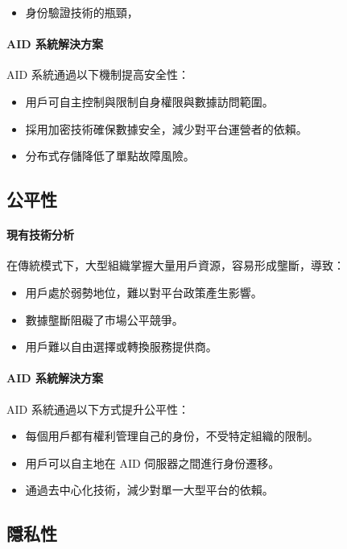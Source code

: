 \begin{itemize}
  \item 身份驗證技術的瓶頸，
\end{itemize}

\paragraph{AID 系統解決方案}
AID 系統通過以下機制提高安全性：
\begin{itemize}
  \item 用戶可自主控制與限制自身權限與數據訪問範圍。
  \item 採用加密技術確保數據安全，減少對平台運營者的依賴。
  \item 分布式存儲降低了單點故障風險。
\end{itemize}

\subsection{公平性}

\paragraph{現有技術分析}
在傳統模式下，大型組織掌握大量用戶資源，容易形成壟斷，導致：
\begin{itemize}
  \item 用戶處於弱勢地位，難以對平台政策產生影響。
  \item 數據壟斷阻礙了市場公平競爭。
  \item 用戶難以自由選擇或轉換服務提供商。
\end{itemize}

\paragraph{AID 系統解決方案}
AID 系統通過以下方式提升公平性：
\begin{itemize}
  \item 每個用戶都有權利管理自己的身份，不受特定組織的限制。
  \item 用戶可以自主地在 AID 伺服器之間進行身份遷移。
  \item 通過去中心化技術，減少對單一大型平台的依賴。
\end{itemize}

\subsection{隱私性}

